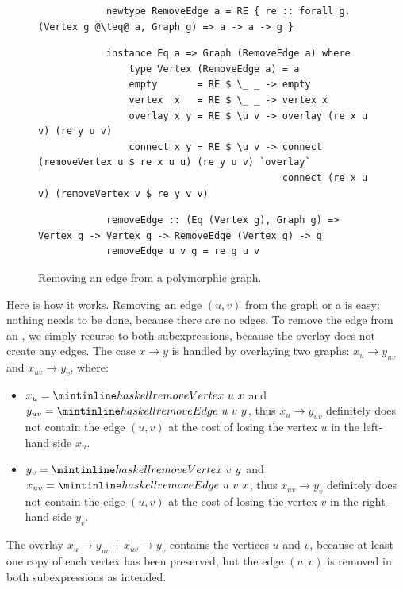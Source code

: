 \begin{figure}
\begin{verbatim}
            newtype RemoveEdge a = RE { re :: forall g. (Vertex g @\teq@ a, Graph g) => a -> a -> g }
\end{verbatim}
\vspace{1mm}
\begin{verbatim}
            instance Eq a => Graph (RemoveEdge a) where
                type Vertex (RemoveEdge a) = a
                empty       = RE $ \_ _ -> empty
                vertex  x   = RE $ \_ _ -> vertex x
                overlay x y = RE $ \u v -> overlay (re x u v) (re y u v)
                connect x y = RE $ \u v -> connect (removeVertex u $ re x u u) (re y u v) `overlay`
                                           connect (re x u v) (removeVertex v $ re y v v)
\end{verbatim}
\vspace{0mm}
\begin{verbatim}
            removeEdge :: (Eq (Vertex g), Graph g) => Vertex g -> Vertex g -> RemoveEdge (Vertex g) -> g
            removeEdge u v g = re g u v
\end{verbatim}
\caption{Removing an edge from a polymorphic graph.}
\end{figure}

\noindent
Here is how it works. Removing an edge $(u,v)$ from the  graph
or a  is easy:
nothing needs to be done, because there are no edges. To remove the edge from an
, we simply recurse to both subexpressions, because the overlay does not create
any edges. The  case $x \rightarrow y$ is handled by overlaying two graphs:
$x_u \rightarrow y_{uv}$ and $x_{uv} \rightarrow y_v$, where:

\begin{itemize}
    \item $x_u = \hs{removeVertex}~u~x$ and $y_{uv} = \hs{removeEdge}~u~v~y$,
    thus $x_u \rightarrow y_{uv}$ definitely does not contain the edge $(u,v)$
    at the cost of losing the vertex $u$ in the left-hand side $x_u$.
    \item $y_v = \hs{removeVertex}~v~y$ and $x_{uv} = \hs{removeEdge}~u~v~x$,
    thus $x_{uv} \rightarrow y_v$ definitely does not contain the edge $(u,v)$
    at the cost of losing the vertex $v$ in the right-hand side $y_v$.
\end{itemize}
\noindent
The overlay $x_u \rightarrow y_{uv} + x_{uv} \rightarrow y_v$ contains the
vertices $u$ and $v$, because at least one copy of each vertex has been preserved,
but the edge $(u,v)$ is removed in both subexpressions as intended.

